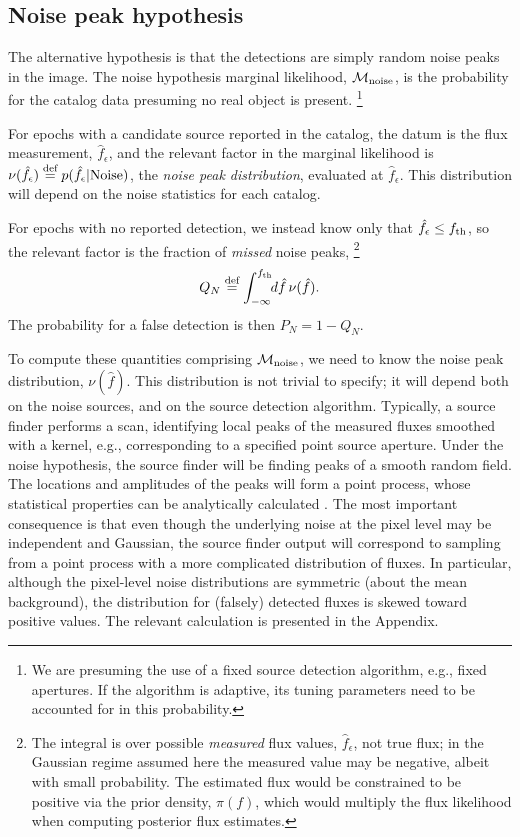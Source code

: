 \documentclass[twocolumn]{emulateapj}
\newcommand*{\defeq}{\stackrel{\text{def}}{=}}
\newcommand{\eind}{\epsilon}  %
\newcommand{\mlike}{\mathcal{M}}  %
\newcommand{\flux}{f}
\newcommand{\fest}{\hat{\flux}}  %
\newcommand{\fth}{\flux_{\rm th}}
\newcommand{\npd}{\nu}  %
\begin{document}
\subsection{Noise peak hypothesis}\label{sec:peaks}
\noindent
%
The alternative hypothesis is that the detections are simply random noise peaks in the image.
The noise hypothesis marginal likelihood, $\mlike_{\rm noise}$, is the probability for the catalog data presuming no real object is present.%
\footnote{We are presuming the use of a fixed source detection algorithm, e.g., fixed apertures. 
If the algorithm is adaptive, its tuning parameters need to be accounted for in this probability.}

For epochs with a candidate source reported in the catalog, the datum is the flux measurement, $\fest_\eind$, and the relevant factor in the marginal likelihood is $\npd(\fest_\eind) \defeq p(\fest_\eind|\rm{Noise})$, the \emph{noise peak distribution}, evaluated at $\fest_\eind$.
This distribution will depend on the noise statistics for each catalog.

For epochs with no reported detection, we instead know only that $\fest_\eind \le \fth$, so the relevant factor is the fraction of \emph{missed} noise peaks,%
\footnote{The integral is over possible \emph{measured} flux values, $\fest_\eind$, not true flux; in the Gaussian regime assumed here the measured value may be negative, albeit with small probability.
The estimated flux would be constrained to be positive via the prior density, $\pi(f)$, which would multiply the flux likelihood when computing posterior flux estimates.}
\begin{equation} \label{eq:Q-noise}
Q_N \defeq \int_{-\infty}^{\fth}\!\!d\fest\,\npd(\fest).
\end{equation}
The probability for a false detection is then $P_N = 1 - Q_N$.

To compute these quantities comprising $\mlike_{\rm noise}$, we need to know the noise peak distribution, $\npd(\fest)$.
This distribution is not trivial to specify; it will depend both on the noise sources, and on the source detection algorithm.
%
Typically, a source finder performs a scan, identifying local peaks of the measured fluxes smoothed with a kernel, e.g., corresponding to a specified point source aperture.
Under the noise hypothesis, the source finder will be finding peaks of a smooth random field.
The locations and amplitudes of the peaks will form a point process, whose statistical properties can be analytically calculated \citep{adler,bbks,bond,kaiser}.
%
The most important consequence is that even though the underlying noise at the pixel level may be independent and Gaussian, the source finder output will correspond to sampling from a point process with a more complicated distribution of fluxes.
In particular, although the pixel-level noise distributions are symmetric (about the mean background), the distribution for (falsely) detected fluxes is skewed toward positive values.
%
The relevant calculation is presented in the Appendix.
\end{document}
